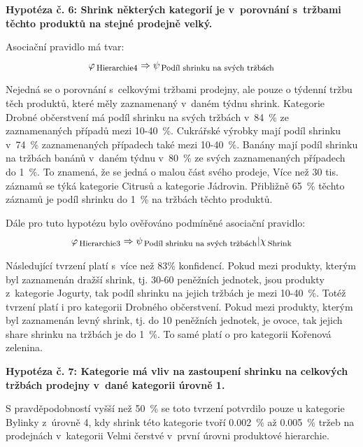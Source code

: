 \vspace*{1em}

\textbf{Hypotéza č. 6: Shrink některých kategorií je v~porovnání s~tržbami těchto produktů na stejné prodejně velký.}

Asociační pravidlo má tvar:
\begin{equation}
    \varphi_{\mbox{\,\footnotesize Hierarchie4}} \Rightarrow \psi_{\mbox{\,\footnotesize Podíl shrinku na svých tržbách}}
\end{equation}

Nejedná se o porovnání s~celkovými tržbami prodejny, ale pouze o týdenní tržbu těch produktů, které měly zaznamenaný v~daném týdnu shrink.
Kategorie Drobné občerstvení má podíl shrinku na svých tržbách v~84~\% ze zaznamenaných případů mezi 10-40~\%.
Cukrářské výrobky  mají podíl shrinku v~74~\% zaznamenaných případech také mezi 10-40~\%.
Banány mají podíl shrinku na tržbách banánů v~daném týdnu v~80~\% ze svých zaznamenaných případech do 1~\%. To znamená, že se jedná o malou část svého prodeje,
Více než 30 tis. záznamů se týká kategorie Citrusů a kategorie Jádrovin. Přibližně 65~\% těchto záznamů je podíl shrinku do 1~\% na tržbách těchto produktů.

Dále pro tuto hypotézu bylo ověřováno podmíněné asociační pravidlo:
\begin{equation}
    \varphi_{\mbox{\,\footnotesize Hierarchie3}} \Rightarrow \psi_{\mbox{\,\footnotesize Podíl shrinku na svých tržbách}} | \chi_{\mbox{\,\footnotesize Shrink}}
\end{equation} 

Následující tvrzení platí s~více než 83\% konfidencí.
Pokud mezi produkty, kterým byl zaznamenán dražší shrink, tj. 30-60 peněžních jednotek, jsou produkty z~kategorie Jogurty, tak podíl shrinku na jejich tržbách je mezi 10-40~\%. Totéž tvrzení platí i pro kategorii Drobného občerstvení.
Pokud mezi produkty, kterým byl zaznamenán levný shrink, tj. do 10 peněžních jednotek, je ovoce, tak jejich share shrinku na tržbách je do 1~\%. To samé platí o pro kategorii Kořenová zelenina.

\vspace*{1em}

\textbf{Hypotéza č. 7: Kategorie má vliv na zastoupení shrinku na celkových tržbách prodejny v~dané kategorii úrovně 1.}

S pravděpodobností vyšší než 50~\% se toto tvrzení potvrdilo pouze u kategorie Bylinky z~úrovně 4, kdy shrink této kategorie tvoří 0.002~\% až 0.005~\% tržeb na prodejnách v~kategorii Velmi čerstvé v~první úrovni produktové hierarchie.

